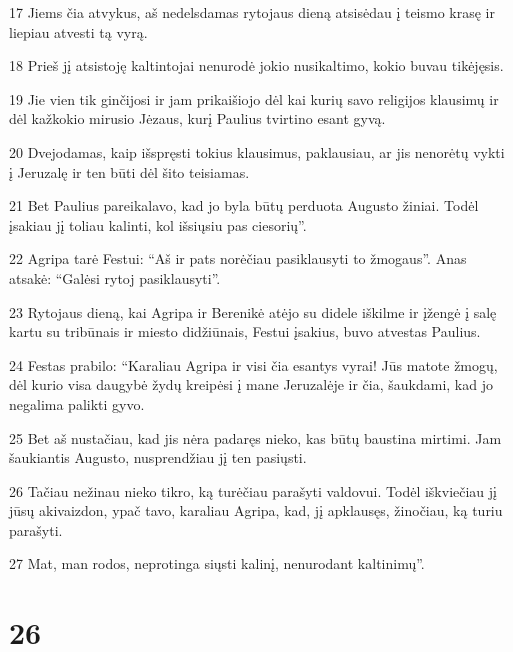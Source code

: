 \par 17 Jiems čia atvykus, aš nedelsdamas rytojaus dieną atsisėdau į teismo krasę ir liepiau atvesti tą vyrą. 
\par 18 Prieš jį atsistoję kaltintojai nenurodė jokio nusikaltimo, kokio buvau tikėjęsis. 
\par 19 Jie vien tik ginčijosi ir jam prikaišiojo dėl kai kurių savo religijos klausimų ir dėl kažkokio mirusio Jėzaus, kurį Paulius tvirtino esant gyvą. 
\par 20 Dvejodamas, kaip išspręsti tokius klausimus, paklausiau, ar jis nenorėtų vykti į Jeruzalę ir ten būti dėl šito teisiamas. 
\par 21 Bet Paulius pareikalavo, kad jo byla būtų perduota Augusto žiniai. Todėl įsakiau jį toliau kalinti, kol išsiųsiu pas ciesorių”. 
\par 22 Agripa tarė Festui: “Aš ir pats norėčiau pasiklausyti to žmogaus”. Anas atsakė: “Galėsi rytoj pasiklausyti”. 
\par 23 Rytojaus dieną, kai Agripa ir Berenikė atėjo su didele iškilme ir įžengė į salę kartu su tribūnais ir miesto didžiūnais, Festui įsakius, buvo atvestas Paulius. 
\par 24 Festas prabilo: “Karaliau Agripa ir visi čia esantys vyrai! Jūs matote žmogų, dėl kurio visa daugybė žydų kreipėsi į mane Jeruzalėje ir čia, šaukdami, kad jo negalima palikti gyvo. 
\par 25 Bet aš nustačiau, kad jis nėra padaręs nieko, kas būtų baustina mirtimi. Jam šaukiantis Augusto, nusprendžiau jį ten pasiųsti. 
\par 26 Tačiau nežinau nieko tikro, ką turėčiau parašyti valdovui. Todėl iškviečiau jį jūsų akivaizdon, ypač tavo, karaliau Agripa, kad, jį apklausęs, žinočiau, ką turiu parašyti. 
\par 27 Mat, man rodos, neprotinga siųsti kalinį, nenurodant kaltinimų”.


\chapter{26}


